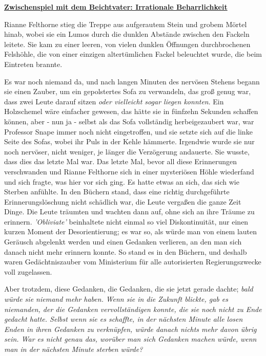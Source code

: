 

\hypertarget{zwischenspiel-mit-dem-beichtvater-irrationale-beharrlichkeit}{%

\textbf{\uline{Zwischenspiel mit dem Beichtvater: Irrationale Beharrlichkeit}}

\hfill\break Rianne Felthorne stieg die Treppe aus aufgerautem Stein und grobem Mörtel hinab, wobei sie ein Lumos durch die dunklen Abstände zwischen den Fackeln leitete. Sie kam zu einer leeren, von vielen dunklen Öffnungen durchbrochenen Felshöhle, die von einer einzigen altertümlichen Fackel beleuchtet wurde, die beim Eintreten brannte.

Es war noch niemand da, und nach langen Minuten des nervösen Stehens begann sie einen Zauber, um ein gepolstertes Sofa zu verwandeln, das groß genug war, dass zwei Leute darauf sitzen \emph{oder vielleicht sogar liegen konnten}. Ein Holzschemel wäre einfacher gewesen, das hätte sie in fünfzehn Sekunden schaffen können, aber - nun ja - selbst als das Sofa vollständig herbeigezaubert war, war Professor Snape immer noch nicht eingetroffen, und sie setzte sich auf die linke Seite des Sofas, wobei ihr Puls in der Kehle hämmerte. Irgendwie wurde sie nur noch nervöser, nicht weniger, je länger die Verzögerung andauerte. Sie wusste, dass dies das letzte Mal war. Das letzte Mal, bevor all diese Erinnerungen verschwanden und Rianne Felthorne sich in einer mysteriösen Höhle wiederfand und sich fragte, was hier vor sich ging. Es hatte etwas an sich, das sich wie Sterben anfühlte. In den Büchern stand, dass eine richtig durchgeführte Erinnerungslöschung nicht schädlich war, die Leute vergaßen die ganze Zeit Dinge. Die Leute träumten und wachten dann auf, ohne sich an ihre Träume zu erinnern. \emph{'Obliviate'} beinhaltete nicht einmal so viel Diskontinuität, nur einen kurzen Moment der Desorientierung; es war so, als würde man von einem lauten Geräusch abgelenkt werden und einen Gedanken verlieren, an den man sich danach nicht mehr erinnern konnte. So stand es in den Büchern, und deshalb waren Gedächtniszauber vom Ministerium für alle autorisierten Regierungszwecke voll zugelassen.

Aber trotzdem, diese Gedanken, die Gedanken, die sie jetzt gerade dachte; \emph{bald würde sie niemand mehr haben.} \emph{Wenn sie in die Zukunft blickte, gab es niemanden, der die Gedanken vervollständigen konnte, die sie noch nicht zu Ende gedacht hatte. Selbst wenn sie es schaffte, in der nächsten Minute alle losen Enden in ihren Gedanken zu verknüpfen, würde danach nichts mehr davon übrig sein. War es nicht genau das, worüber man sich Gedanken machen würde, wenn man in der nächsten Minute sterben würde?}

}
